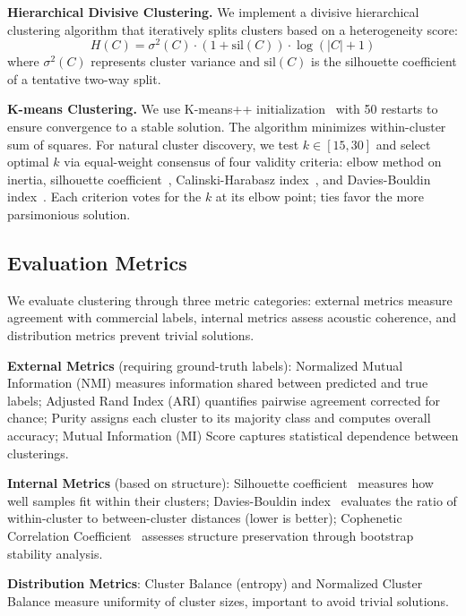 \documentclass{article}
\begin{document}
	\textbf{Hierarchical Divisive Clustering.} We implement a divisive hierarchical clustering algorithm that iteratively splits clusters based on a heterogeneity score:
	\begin{equation}
		H(C) = \sigma^2(C) \cdot (1 + \text{sil}(C)) \cdot \log(|C| + 1)
	\end{equation}
	where $\sigma^2(C)$ represents cluster variance and $\text{sil}(C)$ is the silhouette coefficient of a tentative two-way split.

	\textbf{K-means Clustering.} We use K-means++ initialization~\cite{arthur2007kmeans} with 50 restarts to ensure convergence to a stable solution. The algorithm minimizes within-cluster sum of squares. For natural cluster discovery, we test $k \in [15, 30]$ and select optimal $k$ via equal-weight consensus of four validity criteria: elbow method on inertia, silhouette coefficient~\cite{rousseeuw1987}, Calinski-Harabasz index~\cite{calinski1974dendrite}, and Davies-Bouldin index~\cite{davies1979}. Each criterion votes for the $k$ at its elbow point; ties favor the more parsimonious solution.


	\subsection{Evaluation Metrics}\label{ssec:metrics}

	We evaluate clustering through three metric categories: external metrics measure agreement with commercial labels, internal metrics assess acoustic coherence, and distribution metrics prevent trivial solutions.

	\textbf{External Metrics} (requiring ground-truth labels): Normalized Mutual Information (NMI) measures information shared between predicted and true labels; Adjusted Rand Index (ARI) quantifies pairwise agreement corrected for chance; Purity assigns each cluster to its majority class and computes overall accuracy; Mutual Information (MI) Score captures statistical dependence between clusterings.

	\textbf{Internal Metrics} (based on structure): Silhouette coefficient~\cite{rousseeuw1987} measures how well samples fit within their clusters; Davies-Bouldin index~\cite{davies1979} evaluates the ratio of within-cluster to between-cluster distances (lower is better); Cophenetic Correlation Coefficient~\cite{sokal1962} assesses structure preservation through bootstrap stability analysis.

	\textbf{Distribution Metrics}: Cluster Balance (entropy) and Normalized Cluster Balance measure uniformity of cluster sizes, important to avoid trivial solutions.
\end{document}
